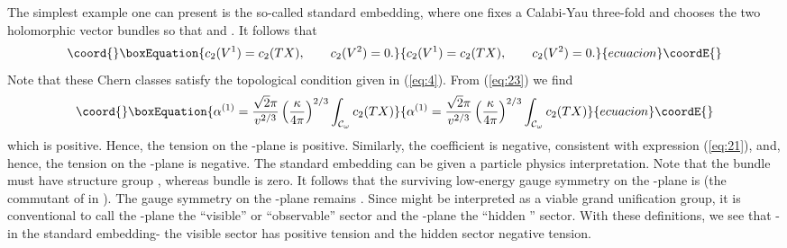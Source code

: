 \documentclass[a4paper,12pt]{article}
\numberwithin{equation}{section}
\theoremstyle{plain}
\begin{document}
The simplest example one can present is the so-called 
standard embedding, where one fixes a Calabi-Yau three-fold and chooses
the two holomorphic vector bundles so that \coordHE{} and \coordHE{}. It
follows that
%
\begin{equation}\coord{}\boxEquation{
c_{2}(V^{1})=c_{2}(TX), \qquad c_{2}(V^{2})=0.
\label{eq:24}
}{
c_{2}(V^{1})=c_{2}(TX), \qquad c_{2}(V^{2})=0.
}{ecuacion}\coordE{}\end{equation}
%
Note that these Chern classes satisfy the topological condition given
in (\ref{eq:4}). From (\ref{eq:23}) we find
%
\begin{equation}\coord{}\boxEquation{
\alpha^{(1)}=\frac{\sqrt{2}\pi}{v^{2/3}}\left(\frac{\kappa}{4\pi}\right)^{2/3}
\int_{{\cal{C}}_{\omega}}{c_{2}(TX)}
\label{eq:25}
}{
\alpha^{(1)}=\frac{\sqrt{2}\pi}{v^{2/3}}\left(\frac{\kappa}{4\pi}\right)^{2/3}
\int_{{\cal{C}}_{\omega}}{c_{2}(TX)}
}{ecuacion}\coordE{}\end{equation}
%
which is positive. Hence, the tension on the \coordHE{}-plane is positive.
Similarly, the coefficient \coordHE{} is negative, consistent
with expression (\ref{eq:21}), and, hence, the tension on the \coordHE{}-plane is
negative. The standard embedding can be given a particle physics
interpretation. Note that the bundle \coordHE{} must have
structure group \coordHE{}, whereas bundle \coordHE{} is zero. It
follows that the surviving low-energy gauge symmetry on the \coordHE{}-plane is
\coordHE{} (the commutant of \coordHE{} in \coordHE{}). The gauge symmetry on the
\coordHE{}-plane remains \coordHE{}. Since \coordHE{} might be interpreted as a viable
grand unification group, it is conventional to call the \coordHE{}-plane the
``visible'' or ``observable'' sector and the \coordHE{}-plane the ``hidden '' sector.
With these definitions, we see that  -in the standard embedding- 
the visible sector has positive tension and the hidden sector negative
tension.
\end{document}
